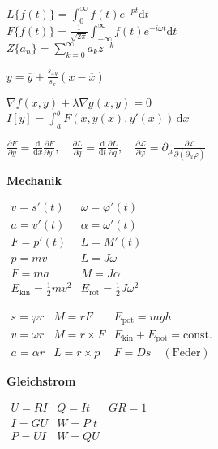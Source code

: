 \documentclass[a4paper, 10pt, fleqn, twocolumn, twoside]{article}
\newcommand{\ds}{\displaystyle}
\begin{document}
$\ds L\{f(t)\} = \int_0^{\infty} f(t)e^{-pt}\mathrm dt$\\
$\ds F\{f(t)\} = \frac{1}{\sqrt{2\pi}}\int_{-\infty}^{\infty}
f(t)e^{-i\omega t}\mathrm dt$\\
$\ds Z\{a_n\} = \sum_{k=0}^\infty a_k z^{-k}$

$\ds y = \overline y + \frac{s_{xy}}{s_x}(x-\overline x)$

$\nabla f(x,y) + \lambda\nabla g(x,y)=0$\\
$I[y]=\ds\int_a^b F(x,y(x),y'(x))\,\mathrm dx$

$\ds \frac{\partial F}{\partial y}
=\frac{\mathrm d}{\mathrm dx} \frac{\partial F}{\partial y'},\quad
\ds \frac{\partial L}{\partial q}
=\frac{\mathrm d}{\mathrm dt} \frac{\partial L}{\partial\dot q},\quad
\ds \frac{\partial\mathcal L}{\partial\varphi}
=\partial_\mu \frac{\partial\mathcal L}{\partial(\partial_\mu\varphi)}$


\newpage


\textbf{Mechanik}

${}\!\!\!\begin{array}{l|l}
v = s'(t) & \omega = \varphi'(t)\\
a = v'(t) & \alpha = \omega'(t)\\
F = p'(t) & L = M'(t)\\
p = mv & L = J\omega\\
F = ma & M = J\alpha\\
E_\mathrm{kin} = \frac{1}{2}mv^2
& E_\mathrm{rot} = \frac{1}{2}J\omega^2
\end{array}$

${}\!\!\!\begin{array}{l|l|l}
s=\varphi r& M=rF & E_\mathrm{pot} = mgh\\
v=\omega r & M=r\times F & E_\mathrm{kin}+E_\mathrm{pot} = \mathrm{const.}\\
a=\alpha r& L=r\times p & F = Ds\quad \mathrm{(Feder)}
\end{array}$



\textbf{Gleichstrom}

${}\!\!\!\begin{array}{l|l|l}
U=RI & Q=It & GR=1\\
I=GU & W=P\;\!t\\
P=UI & W=QU\\
\end{array}$
\end{document}
